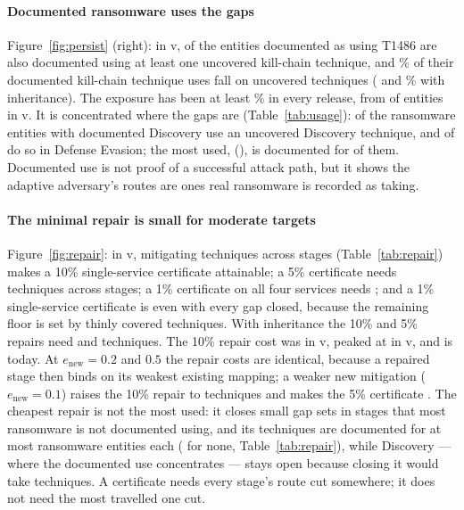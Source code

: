 \documentclass[conference,compsoc]{IEEEtran}
\begin{document}
\paragraph{Documented ransomware uses the gaps} Figure~\ref{fig:persist} (right): in
v\GapLastVersion, \UseExposed{} of the \UseEntities{} entities documented as using T1486
are also documented using at least one uncovered kill-chain technique, and
\UseSharePct\% of their documented kill-chain technique uses fall on uncovered
techniques (\UseInhExposed{} and \UseInhSharePct\% with inheritance). The exposure has
been at least \UseMinExposedPct\% in every release, from \UseFirstExposed{} of
\UseFirstEntities{} entities in v\GapFirstVersion. It is concentrated where the gaps
are (Table~\ref{tab:usage}): \UseDiscUnc{} of the \UseDiscAll{} ransomware entities with
documented Discovery use an uncovered Discovery technique, and \UseDEUnc{} of
\UseDEAll{} do so in Defense Evasion; the most used, \UseTopName{} (\UseTopTech), is
documented for \UseTopCount{} of them. Documented use is not proof of a successful
attack path, but it shows the adaptive adversary's routes are ones real ransomware is
recorded as taking.

\paragraph{The minimal repair is small for moderate targets} Figure~\ref{fig:repair}:
in v\GapLastVersion, mitigating \GapRepTenOne{} techniques across \GapRepTenOneStages{}
stages (Table~\ref{tab:repair}) makes a 10\% single-service certificate attainable; a 5\%
certificate needs \GapRepFiveOne{} techniques across \GapRepFiveOneStages{} stages; a 1\%
certificate on all four services needs \GapRepOneFour; and a 1\% single-service
certificate is \GapRepOneOne{} even with every gap closed, because the remaining floor is
set by thinly covered techniques. With inheritance the 10\% and 5\% repairs need
\GapInhRepTen{} and \GapInhRepFive{} techniques. The 10\% repair cost was
\GapRepHistFirst{} in v\GapFirstVersion, peaked at \GapRepHistMax{} in
v\GapRepHistMaxVersion, and is \GapRepTenOne{} today. At $e_{\mathrm{new}}=0.2$ and
$0.5$ the repair costs are identical, because a repaired stage then binds on its weakest
existing mapping; a weaker new mitigation ($e_{\mathrm{new}}=0.1$) raises the 10\%
repair to \GapRepWeakTenOne{} techniques and makes the 5\% certificate
\GapRepWeakFiveOne. The cheapest repair is not the most used: it closes small gap sets in
stages that most ransomware is not documented using, and its techniques are documented
for at most \UseRepairMax{} ransomware entities each (\UseRepairUnused{} for none,
Table~\ref{tab:repair}), while Discovery --- where the documented use concentrates ---
stays open because closing it would take \GapWorstShareUnc{} techniques. A certificate
needs every stage's route cut somewhere; it does not need the most travelled one cut.
\end{document}

